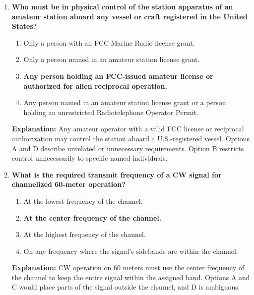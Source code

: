\begin{enumerate}
\item \textbf{Who must be in physical control of the station apparatus of an amateur station aboard any vessel or craft registered in the United States?}
    \begin{enumerate}
        \item Only a person with an FCC Marine Radio license grant.\\
        \item Only a person named in an amateur station license grant.\\
        \item \textbf{Any person holding an FCC-issued amateur license or authorized for alien reciprocal operation.}\\
        \item Any person named in an amateur station license grant or a person holding an unrestricted Radiotelephone Operator Permit.
    \end{enumerate}
    \textbf{Explanation:} Any amateur operator with a valid FCC license or reciprocal authorization may control the station aboard a U.S.-registered vessel. Options A and D describe unrelated or unnecessary requirements. Option B restricts control unnecessarily to specific named individuals.

    \item \textbf{What is the required transmit frequency of a CW signal for channelized 60-meter operation?}
    \begin{enumerate}
        \item At the lowest frequency of the channel.\\
        \item \textbf{At the center frequency of the channel.}\\
        \item At the highest frequency of the channel.\\
        \item On any frequency where the signal's sidebands are within the channel.
    \end{enumerate}
    \textbf{Explanation:} CW operation on 60 meters must use the center frequency of the channel to keep the entire signal within the assigned band. Options A and C would place parts of the signal outside the channel, and D is ambiguous.


\end{enumerate}
